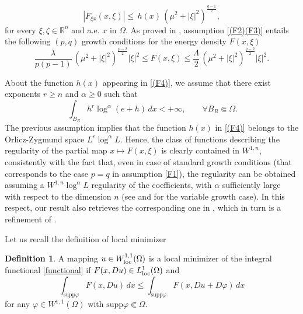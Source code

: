 \documentclass[12pt]{amsart}
\theoremstyle{definition}
\newtheorem{definition}[theorem]{Definition}
\numberwithin{equation}{section}
\numberwithin{equation}{section}
\begin{document}
{\begin{equation}\label{(F4)}|F_{\xi x}(x, \xi)| \le \, h(x) \, (\mu^2 + |\xi|^2)^{\frac{q-1}{2}},  \end{equation}
for every $\xi,\zeta \in \mathbb{R}^n$ and a.e. $x$ in $\Omega$.
As proved in \cite[Lemma 2.3]{CMMP2023}, assumption \eqref{(F2)(F3)} entails the following  $(p,q)$ growth
conditions for the energy density $F (x, \xi)$
\begin{equation}\label{F1}
\frac{\lambda}{p(p-1)} \, (\mu^2 + |\xi|^2)^{\frac{p-2}{2}} |\xi|^2 \le F (x, \xi) \le \frac{\Lambda}{2} \, (\mu^2 + |\xi|^2)^{\frac{q-2}{2}}|\xi|^2.
\end{equation}

About the function $h(x)$ appearing in  \eqref{(F4)}, we  assume that there exist
exponents $r\ge n$ and $\alpha\ge 0$ such that 
\begin{equation}\label{F5F6}
\
 \int_{B_R} h^r \log^{\alpha } (e + h)  \, dx < + \infty, \qquad \forall B_R \Subset \Omega. 
\end{equation}
The previous assumption  implies that the function $h(x)$  in \eqref{(F4)} belongs to the Orlicz-Zygmund space $L^r \log^{\alpha }L$. %
Hence,  the class of functions describing the regularity of the partial map $x \mapsto F(x, \xi)$ is clearly contained in  $W^{1,n}$, consistently with the fact that, even in case of standard growth  conditions (that corresponds to the case $p = q$ in assumption \eqref{F1}), the regularity can be obtained assuming a $W^{1,n}\log^\alpha L$ regularity of the coefficients, with $\alpha$ sufficiently large with respect to the dimension $n$ (see \cite{CGHPdN20} and \cite{EPdN23}  for the variable growth case). In this respect, our result also retrieves the corresponding one in  \cite{CGHPdN20}, which in turn is a refinement of \cite{EMM19}.

\vspace{2mm}


Let us recall the definition of local minimizer
\begin{definition}
A mapping $u\in W^{1,1}_{\rm loc}(\Omega)$ is a local minimizer {of the integral functional \eqref{functional}} if
$F(x,Du) \in L^{1}_{\rm loc}(\Omega )$ and
\begin{equation}\label{minineq}
 \int_{\mathrm{supp}\varphi} \! F(x,Du) \, dx \leq \int_{\mathrm{supp}\varphi} \! F(x,Du+D\varphi) \, dx   
\end{equation}
for  any $\varphi\in W^{1,1}(\Omega)$ with $\mathrm{supp}\varphi\Subset\Omega$.
\end{definition} 

}
\end{document}
